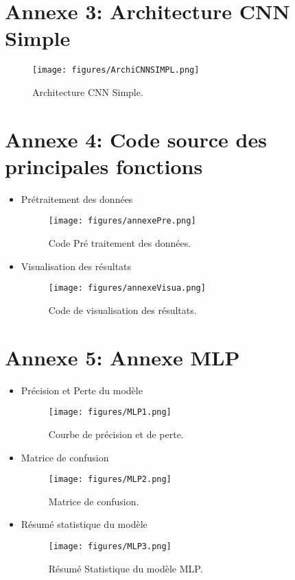 \section*{Annexe 3: Architecture CNN Simple}
\label{sec:annexe3}
\begin{figure}[H]
\centering
\texttt{[image: figures/ArchiCNNSIMPL.png]}
\caption{Architecture CNN Simple.}
\label{fig:Architecture CNN Simple}
\end{figure}




\section*{Annexe 4: Code source des principales fonctions}
\label{sec:annexe2}
\begin{itemize}
\item Prétraitement des données
\begin{figure}[H]
\centering
\texttt{[image: figures/annexePre.png]}
\caption{Code Pré traitement des données.}
\label{fig:Prétraitement des données}
\end{figure}
\item Visualisation des résultats
\begin{figure}[H]
\centering
\texttt{[image: figures/annexeVisua.png]}
\caption{Code de visualisation des résultats.}
\label{fig:annexeVisua}
\end{figure}
\end{itemize}


\section*{Annexe 5: Annexe MLP}
\label{sec:annexe5}
\begin{itemize}
\item Précision et Perte du modèle
\begin{figure}[H]
\centering
\texttt{[image: figures/MLP1.png]}
\caption{Courbe de précision et de perte.}
\label{fig:annexe5.1}
\end{figure}
\item Matrice de confusion
\begin{figure}[H]
\centering
\texttt{[image: figures/MLP2.png]}
\caption{Matrice de confusion.}
\label{fig:annexe5.2}
\end{figure}
\item Résumé statistique du modèle
\begin{figure}[H]
\centering
\texttt{[image: figures/MLP3.png]}
\caption{Résumé Statistique du modèle MLP.}
\label{fig:annexe5.3}
\end{figure}
\end{itemize}


